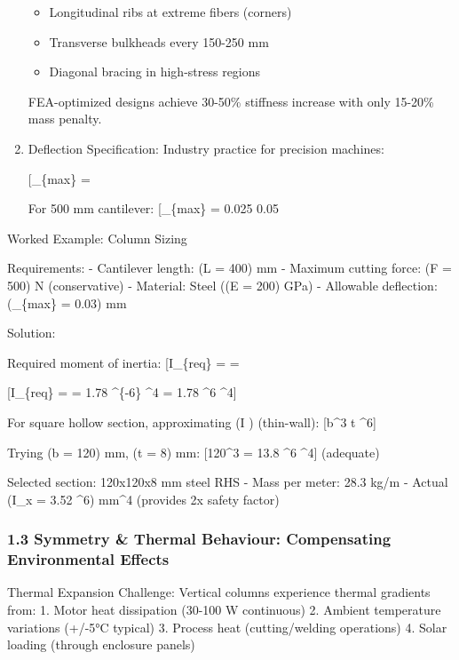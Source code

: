 \documentclass[
]{article}
\providecommand{\tightlist}{%
  \setlength{\itemsep}{0pt}\setlength{\parskip}{0pt}}
\begin{document}
\begin{enumerate}
  \begin{itemize}
  \tightlist
  \item
    Longitudinal ribs at extreme fibers (corners)
  \item
    Transverse bulkheads every 150-250 mm
  \item
    Diagonal bracing in high-stress regions
  \end{itemize}

  FEA-optimized designs achieve 30-50\% stiffness increase with only
  15-20\% mass penalty.
\item
  Deflection Specification: Industry practice for precision machines:

  {[}\delta\_\{max\} =   \frac{L}{20,000}{]}

  For 500 mm cantilever: {[}\delta\_\{max\} = 0.025  0.05
  \text{ mm}{]}
\end{enumerate}

Worked Example: Column Sizing

Requirements: - Cantilever length: (L = 400) mm - Maximum cutting force:
(F = 500) N (conservative) - Material: Steel ((E = 200) GPa) - Allowable
deflection: (\delta\_\{max\} = 0.03) mm

Solution:

Required moment of inertia: {[}I\_\{req\} =
 =
\frac{500 \times 0.4^3}{3 \times 200 \times 10^9 \times 0.00003}{]}

{[}I\_\{req\} =  = 1.78 \^{}\{-6\}
\^{}4 = 1.78 \^{}6 \^{}4{]}

For square hollow section, approximating (I \approx {})
(thin-wall): {[}b\^{}3 t  \^{}6{]}

Trying (b = 120) mm, (t = 8) mm: {[}120\^{}3  = 13.8
\^{}6 \^{}4{]} (adequate)

Selected section: 120x120x8 mm steel RHS - Mass per meter: 28.3 kg/m -
Actual (I\_x = 3.52 \^{}6) mm\^{}4 (provides 2x safety factor)

\subsubsection{1.3 Symmetry \& Thermal Behaviour: Compensating
Environmental
Effects}\label{symmetry-thermal-behaviour-compensating-environmental-effects}

Thermal Expansion Challenge: Vertical columns experience thermal
gradients from: 1. Motor heat dissipation (30-100 W continuous) 2.
Ambient temperature variations (+/-5°C typical) 3. Process heat
(cutting/welding operations) 4. Solar loading (through enclosure panels)
\end{document}
